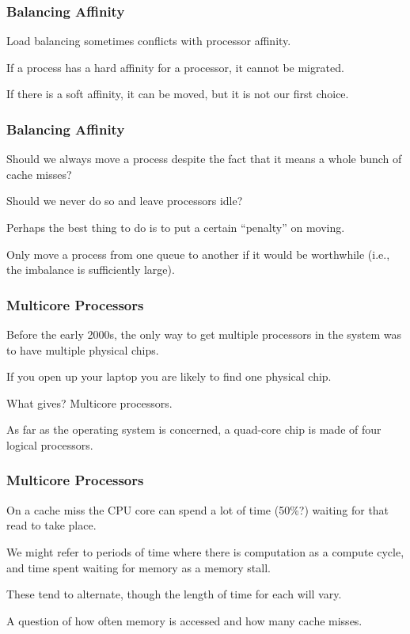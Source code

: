 \begin{frame}
\frametitle{Balancing Affinity}

Load balancing sometimes conflicts with processor affinity. 

If a process has a hard affinity for a processor, it cannot be migrated. 

If there is a soft affinity, it can be moved, but it is not our first choice.

\end{frame}

\begin{frame}
\frametitle{Balancing Affinity}

Should we always move a process despite the fact that it means a whole bunch of cache misses?

Should we never do so and leave processors idle? 

Perhaps the best thing to do is to put a certain ``penalty'' on moving.

Only move a process from one queue to another if it would be worthwhile (i.e., the imbalance is sufficiently large).

\end{frame}

\begin{frame}
\frametitle{Multicore Processors}

Before the early 2000s, the only way to get multiple processors in the system was to have multiple physical chips. 

If you open up your laptop you are likely to find one physical chip. 

What gives? \alert{Multicore processors}. 

As far as the operating system is concerned, a quad-core chip is made of four logical processors.

\end{frame}

\begin{frame}
\frametitle{Multicore Processors}

On a cache miss the CPU core can spend a lot of time (50\%?) waiting for that read to take place.

  We might refer to periods of time where there is computation as a compute cycle, and time spent waiting for memory as a \alert{memory stall}. 
  
  These tend to alternate, though the length of time for each will vary. 
  
  A question of how often memory is accessed and how many cache misses.

\end{frame}

